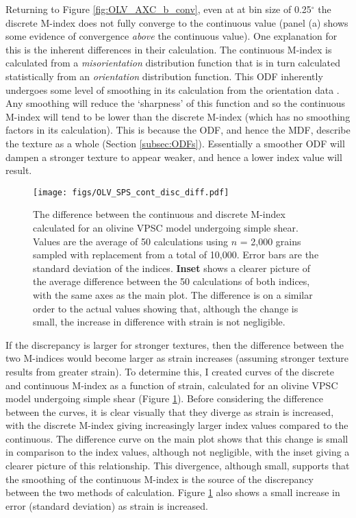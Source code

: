 \documentclass[a4paper,12pt,twoside]{report}
\numberwithin{equation}{chapter}
\begin{document}
Returning to Figure \ref{fig:OLV_AXC_b_conv}, even at at bin size of 0.25$^\circ$ the discrete M-index does not fully converge to the continuous value (panel (a) shows some evidence of convergence \emph{above} the continuous value). One explanation for this is the inherent differences in their calculation. The continuous M-index is calculated from a \emph{misorientation} distribution function that is in turn calculated statistically from an \emph{orientation} distribution function. This ODF inherently undergoes some level of smoothing in its calculation from the orientation data \citep[e.g. regularisation when inverting for the ODF in the \texttt{MTEX} algorithm, see][]{Hielscher2008}. Any smoothing will reduce the \lq{}sharpness\rq{} of this function and so the continuous M-index will tend to be lower than the discrete M-index (which has no smoothing factors in its calculation). This is because the ODF, and hence the MDF, describe the texture as a whole (Section \ref{subsec:ODFs}). Essentially a smoother ODF will dampen a stronger texture to appear weaker, and hence a lower index value will result. 

\begin{figure}[h]
  \centering
    \texttt{[image: figs/OLV\_SPS\_cont\_disc\_diff.pdf]}
  \caption[Discrete and continuous M-index difference (olivine VPSC)]{The difference between the continuous and discrete M-index calculated for an olivine VPSC model undergoing simple shear. Values are the average of 50 calculations using $n$ = 2,000 grains sampled with replacement from a total of 10,000. Error bars are the standard deviation of the indices. \textbf{Inset} shows a clearer picture of the average difference between the 50 calculations of both indices, with the same axes as the main plot. The difference is on a similar order to the actual values showing that, although the change is small, the increase in difference with strain is not negligible.}
  \label{fig:OLV_SPS_cont_disc_diff}
\end{figure}  

If the discrepancy is larger for stronger textures, then the difference between the two M-indices would become larger as strain increases (assuming stronger texture results from greater strain). To determine this, I created curves of the discrete and continuous M-index as a function of strain, calculated for an olivine VPSC model undergoing simple shear (Figure \ref{fig:OLV_SPS_cont_disc_diff}). Before considering the difference between the curves, it is clear visually that they diverge as strain is increased, with the discrete M-index giving increasingly larger index values compared to the continuous. The difference curve on the main plot shows that this change is small in comparison to the index values, although not negligible, with the inset giving a clearer picture of this relationship. This divergence, although small, supports that the smoothing of the continuous M-index is the source of the discrepancy between the two methods of calculation. Figure \ref{fig:OLV_SPS_cont_disc_diff} also shows a small increase in error (standard deviation) as strain is increased. 
\end{document}
